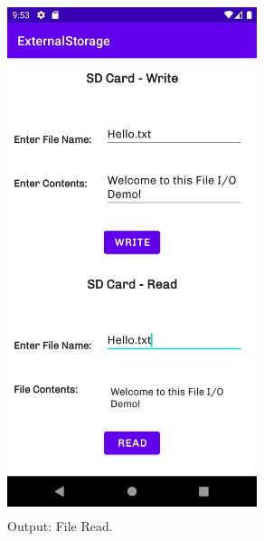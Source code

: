 \documentclass[12pt, a4]{article}
\begin{document}
\subsection*{}
\begin{figure}[h]
\centering
\caption{Output: File Read.}
\includegraphics[height=15cm, width=7.3cm]{ExternalStorage/Screenshots/Output-3.png}
\end{figure}


\newpage
\end{document}
